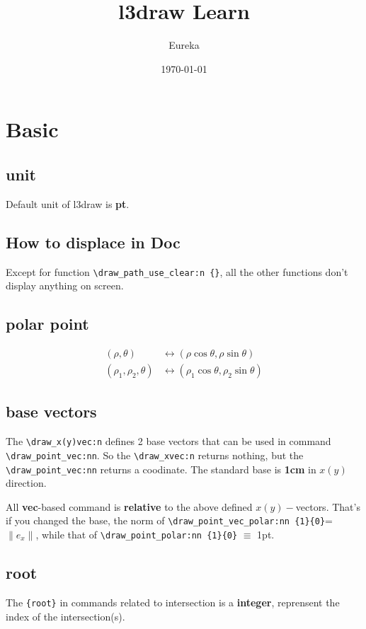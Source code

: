 \documentclass{article}
\title{l3draw Learn}
\author{Eureka}
\date{\today}
\begin{document}
\maketitle
\tableofcontents
\section{Basic}
\subsection{unit}
Default unit of l3draw is \textbf{pt}.


\subsection{How to displace in Doc}
Except for function \verb|\draw_path_use_clear:n {}|, all the other functions don't display 
anything on screen.


\subsection{polar point}
\begin{align}
  (\rho, \theta) & \leftrightarrow (\rho\cos\theta, \rho\sin\theta) \\
  (\rho_1, \rho_2, \theta)& \leftrightarrow (\rho_1\cos\theta, \rho_2\sin\theta)
\end{align}


\subsection{base vectors}
The \verb|\draw_x(y)vec:n| defines 2 base vectors that can be used in command \verb|\draw_point_vec:nn|.
So the \verb|\draw_xvec:n| returns nothing, but the \verb|\draw_point_vec:nn| returns a coodinate. The standard
base is \textbf{1cm} in $x(y)$ direction.

All \textbf{vec}-based command is \textbf{relative} to the above defined $x(y)-$vectors. That's 
if you changed the base, the norm of \verb|\draw_point_vec_polar:nn {1}{0}|= $\|e_x\|$, while that 
of \verb|\draw_point_polar:nn {1}{0}| $\equiv$ 1pt. 

\subsection{root}
The \verb|{root}| in commands related to intersection is a \textbf{integer}, reprensent the index of the intersection(s).
\end{document}
